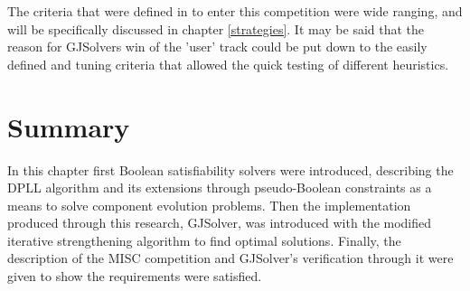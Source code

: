 The criteria that were defined in to enter this competition were wide ranging, and will be specifically discussed in chapter \ref{strategies}.
It may be said that the reason for GJSolvers win of the 'user' track could be put down to the easily defined and tuning criteria that allowed the quick testing of different heuristics.




\section{Summary}
In this chapter first Boolean satisfiability solvers were introduced, 
describing the DPLL algorithm and its extensions through pseudo-Boolean constraints as a means to solve component evolution problems.
Then the implementation produced through this research, GJSolver, was introduced with the modified iterative strengthening algorithm to find optimal solutions.
Finally, the description of the MISC competition and GJSolver's verification through it were given to show the requirements were satisfied.
